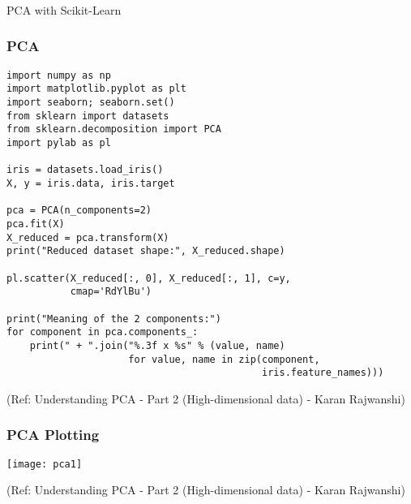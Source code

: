 \begin{frame}[fragile]\frametitle{}
\begin{center}
{\Large PCA with Scikit-Learn}
\end{center}
\end{frame}

\begin{frame}[fragile]\frametitle{PCA}
\begin{lstlisting}
import numpy as np
import matplotlib.pyplot as plt
import seaborn; seaborn.set()
from sklearn import datasets
from sklearn.decomposition import PCA
import pylab as pl

iris = datasets.load_iris()
X, y = iris.data, iris.target

pca = PCA(n_components=2)
pca.fit(X)
X_reduced = pca.transform(X)
print("Reduced dataset shape:", X_reduced.shape)

pl.scatter(X_reduced[:, 0], X_reduced[:, 1], c=y,
           cmap='RdYlBu')

print("Meaning of the 2 components:")
for component in pca.components_:
    print(" + ".join("%.3f x %s" % (value, name)
                     for value, name in zip(component,
                                            iris.feature_names)))
\end{lstlisting}

{\tiny (Ref: Understanding PCA - Part 2 (High-dimensional data) - Karan Rajwanshi)}

\end{frame}

\begin{frame}[fragile]\frametitle{PCA Plotting}
\begin{center}
\texttt{[image: pca1]}
\end{center}

{\tiny (Ref: Understanding PCA - Part 2 (High-dimensional data) - Karan Rajwanshi)}

\end{frame}




